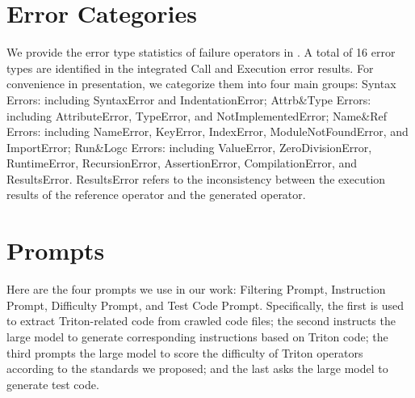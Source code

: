 \section{Error Categories}
\label{app:error_catgrz}
We provide the error type statistics of failure operators in \benchall. A total of 16 error types are identified in the integrated Call and Execution error results. For convenience in presentation, we categorize them into four main groups: Syntax Errors: including SyntaxError and IndentationError; Attrb\&Type Errors: including AttributeError, TypeError, and NotImplementedError; Name\&Ref Errors: including NameError, KeyError, IndexError, ModuleNotFoundError, and ImportError; Run\&Logc Errors: including ValueError, ZeroDivisionError, RuntimeError, RecursionError, AssertionError, CompilationError, and ResultsError. ResultsError refers to the inconsistency between the execution results of the reference operator and the generated operator.

\section{Prompts}
Here are the four prompts we use in our work: Filtering Prompt, Instruction Prompt, Difficulty Prompt, and Test Code Prompt. Specifically, the first is used to extract Triton-related code from crawled code files; the second instructs the large model to generate corresponding instructions based on Triton code; the third prompts the large model to score the difficulty of Triton operators according to the standards we proposed; and the last asks the large model to generate test code.
\onecolumn




